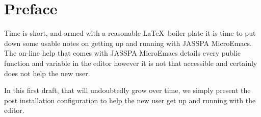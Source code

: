 \documentclass[11pt,a4paper,pdftex]{article}
\begin{document}
\newpage
\setlength{\parindent}{0pt}
\setlength{\parskip}{0.5ex}
\pagestyle{fancy}

\section*{Preface}

Time is short, and armed with a reasonable \LaTeX\ boiler plate it is time to
put down some usable notes on getting up and running with JASSPA MicroEmacs.
The on-line help that comes with JASSPA MicroEmacs details every public
function and variable in the editor however it is not that accessible and
certainly does not help the new user.

In this first draft, that will undoubtedly grow over time, we simply present
the post installation configuration to help the new user get up and running
with the editor.


\newpage
{}          %
\tableofcontents
\newpage


\cleardoublepage
\setcounter{pagetemp}{\value{page}}     %
\setcounter{page}{\value{pagetemp}}     %
\end{document}

